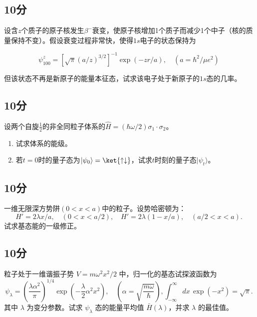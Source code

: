 \subsection{10分}
设含$z$个质子的原子核发生$\beta^-$衰变，使原子核增加1个质子而减少1个中子（核的质量保持不变）。假设衰变过程非常快，使得$1s$电子的状态保持为

    \[
    \psi^z_{100} = \left[ \sqrt{\pi}(a/z)^{3/2} \right]^{-1} \exp(-zr/a), \quad (a = \hbar^2/\mu e^2)~
    \]

    但该状态不再是新原子的能量本征态，试求该电子处于新原子的$1s$态的几率。
\subsection{10分}
设两个自旋$\frac{1}{2}$的非全同粒子体系的$\hat{H} = (\hbar \omega/2)\sigma_1 \cdot \sigma_2$。 
    \begin{enumerate}
        \item 试求体系的能级。
        \item 若$t = 0$时的量子态为$|\psi_0\rangle = \ket{\uparrow \downarrow}$，试求$t$时刻的量子态$|\psi_t\rangle$。
    \end{enumerate}
\subsection{10分}
一维无限深方势阱$ (0 < x < a) $中的粒子。设势哈密顿为：
    \[
    H' = 2\lambda x/a, \quad (0 < x < a/2), \quad H' = 2\lambda(1 - x/a), \quad (a/2 < x < a).~
    \]
    试求基态能的一级修正。
    
\subsection{10分}
粒子处于一维谐振子势 $V = m\omega^2x^2/2$ 中，归一化的基态试探波函数为
\[
\psi_{\lambda} = \left(\frac{\lambda \alpha^2}{\pi}\right)^{1/4} \exp\left(-\frac{\lambda }{2}\alpha^2 x^2\right), \quad \left(\alpha = \sqrt{\frac{m\omega}{\hbar}}\right),\int_{-\infty}^{\infty} dx \, \exp(-x^2) = \sqrt{\pi}.~
\]
其中 $\lambda$ 为变分参数。试求 $\psi_{\lambda}$ 态的能量平均值 $\bar{H}(\lambda)$，并求 $\lambda$ 的最佳值。